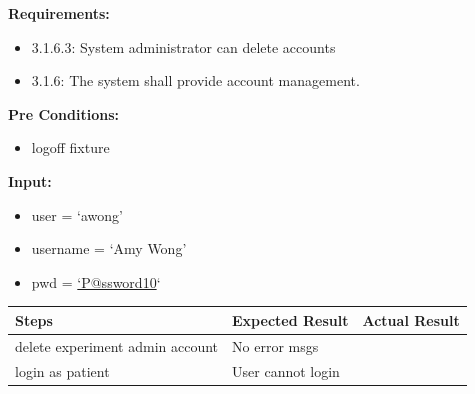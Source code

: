\documentclass[letterpaper,10pt,english]{sphinxmanual}
\begin{document}

\begin{fulllineitems}
\label{STD/test_create_account:test_create_account.test_delete_experiment_admin}
\textbf{Requirements:}
\begin{itemize}
\item {} 
3.1.6.3: System administrator can delete accounts

\item {} 
3.1.6: The system shall provide account management.

\end{itemize}

\textbf{Pre Conditions:}
\begin{itemize}
\item {} 
logoff fixture

\end{itemize}

\textbf{Input:}
\begin{itemize}
\item {} 
user = `awong'

\item {} 
username = `Amy Wong'

\item {} 
pwd = \href{mailto:'P@ssword10}{`P@ssword10}`

\end{itemize}

\begin{tabulary}{\linewidth}{|L|L|L|}
\hline
\textsf{\relax 
Steps
} & \textsf{\relax 
Expected Result
} & \textsf{\relax 
Actual Result
}\\
\hline
delete experiment admin account
 & 
No error msgs
 & \\
\hline
login as patient
 & 
User cannot login
 & \\
\hline\end{tabulary}


\end{fulllineitems}

\end{document}
